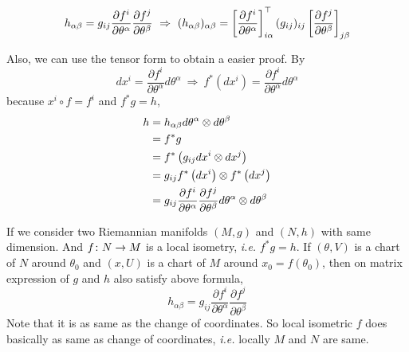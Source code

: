 \begin{enumerate}[label=\arabic{*}.]
\begin{equation*}
		h_{\alpha \beta} = g_{ij}\frac{\partial f^i}{\partial \theta^\alpha} \frac{\partial f^j}{\partial \theta^\beta} ~\Rightarrow~ (h_{\alpha \beta})_{\alpha \beta} = \left[\frac{\partial f^i}{\partial \theta^\alpha}\right]_{i\alpha}^\top (g_{ij})_{ij}\left[\frac{\partial f^j}{\partial \theta^\beta}\right]_{j\beta}
	\end{equation*}
	\begin{rmk}
		Also, we can use the tensor form to obtain a easier proof. By
		\begin{equation*}
			dx^i = \frac{\partial f^i}{\partial \theta^\alpha}d\theta^\alpha~\Rightarrow~f^*(dx^i) = \frac{\partial f^i}{\partial \theta^\alpha}d\theta^\alpha
		\end{equation*}
		because $x^i \circ f = f^i$ and $f^*g = h$,
		\begin{equation*}
			\begin{aligned}
				h &= h_{\alpha \beta}d\theta^\alpha \otimes d\theta^\beta \\
				&= f^*g \\
				&= f^*\left(g_{ij}dx^i \otimes dx^j\right)\\
				&= g_{ij}f^*\left(dx^i\right) \otimes f^*\left(dx^j\right) \\
				&=g_{ij}\frac{\partial f^i}{\partial \theta^\alpha}\frac{\partial f^j}{\partial \theta^\beta}d\theta^\alpha \otimes d\theta^\beta
			\end{aligned}
		\end{equation*}
	\end{rmk}
	\begin{rmk}
		If we consider two Riemannian manifolds $(M,g)$ and $(N,h)$ with same dimension. And $f \colon N \rightarrow M$ is a local isometry, \emph{i.e.} $f^*g = h$. If $(\theta,V)$ is a chart of $N$ around $\theta_0$ and $(x,U)$ is a chart of $M$ around $x_0 = f(\theta_0)$, then on matrix expression of $g$ and $h$ also satisfy above formula,
		\begin{equation*}
			h_{\alpha \beta} = g_{ij}\frac{\partial f^i}{\partial \theta^\alpha}\frac{\partial f^j}{\partial \theta^\beta}
		\end{equation*} 
		Note that it is as same as the change of coordinates. So local isometric $f$ does basically as same as change of coordinates, \emph{i.e.} locally $M$ and $N$ are same.
	\end{rmk}


\end{enumerate}
